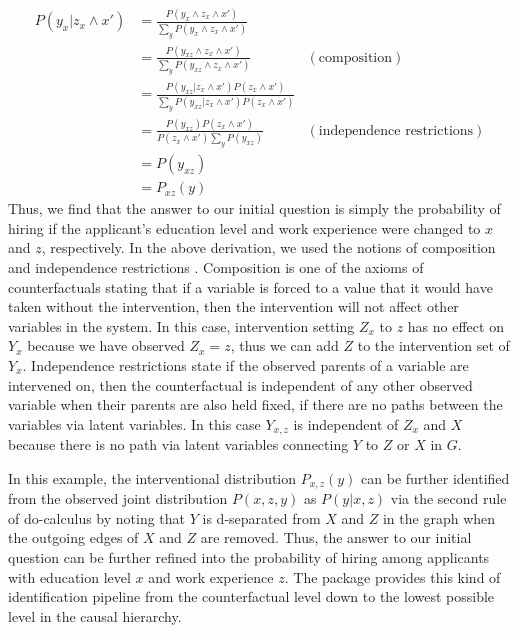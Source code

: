\begin{align*}
  P(y_x|z_x \wedge x') 
    &= \frac{P(y_x \wedge z_x \wedge x')}{\sum_{y}P(y_x \wedge z_x \wedge x')} & \\
    &= \frac{P(y_{xz} \wedge z_x \wedge x')}{\sum_{y}P(y_{xz} \wedge z_x \wedge x')} & (\text{composition})\\
    &= \frac{P(y_{xz} | z_x \wedge x')P(z_x \wedge x')}{\sum_{y}P(y_{xz} | z_x \wedge x')P(z_x \wedge x')} & \\
    &= \frac{P(y_{xz})P(z_x \wedge x')}{P(z_x \wedge x')\sum_y P(y_{xz})} & (\text{independence restrictions}) \\
    &= P(y_{xz}) \\
    &= P_{xz}(y)
\end{align*}
Thus, we find that the answer to our initial question is simply the probability of hiring if the applicant's education level and work experience were changed to \(x\) and \(z\), respectively. In the above derivation, we used the notions of composition and independence restrictions \citep{holland1986, pearl1995, halpern1998, pearl2009}. Composition is one of the axioms of counterfactuals stating that if a variable is forced to a value that it would have taken without the intervention, then the intervention will not affect other variables in the system. In this case, intervention setting \(Z_x\) to \(z\) has no effect on \(Y_x\) because we have observed \(Z_x = z\), thus we can add \(Z\) to the intervention set of \(Y_x\). Independence restrictions state if the observed parents of a variable are intervened on, then the counterfactual is independent of any other observed variable when their parents are also held fixed, if there are no paths between the variables via latent variables. In this case \(Y_{x,z}\) is independent of \(Z_x\) and \(X\) because there is no path via latent variables connecting \(Y\) to \(Z\) or \(X\) in \(G\). 

In this example, the interventional distribution \(P_{x,z}(y)\) can be further identified from the observed joint distribution \(P(x,z,y)\) as \(P(y|x,z)\) via the second rule of do-calculus by noting that \(Y\) is d-separated from \(X\) and \(Z\) in the graph when the outgoing edges of \(X\) and \(Z\) are removed. Thus, the answer to our initial question can be further refined into the probability of hiring among applicants with education level \(x\) and work experience \(z\). The  package provides this kind of identification pipeline from the counterfactual level down to the lowest possible level in the causal hierarchy.

